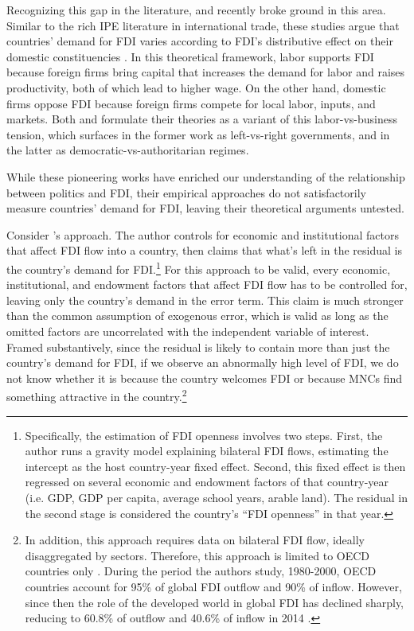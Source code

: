 Recognizing this gap in the literature, \citet{Pinto2013} and \citet{Pandya2016}
recently broke ground in this area. Similar to the rich IPE literature in
international trade, these studies argue that countries' demand for FDI varies
according to FDI's distributive effect on their domestic constituencies
\citep{Broz2001, Milner2005a}. In this theoretical framework, labor supports FDI
because foreign firms bring capital that increases the demand for labor and
raises productivity, both of which lead to higher wage. On the other hand,
domestic firms oppose FDI because foreign firms compete for local labor, inputs,
and markets. Both \citet{Pinto2013} and \citet{Pandya2016} formulate their
theories as a variant of this labor-vs-business tension, which surfaces in the
former work as left-vs-right governments, and in the latter as
democratic-vs-authoritarian regimes.

While these pioneering works have enriched our understanding of the relationship
between politics and FDI, their empirical approaches do not satisfactorily
measure countries' demand for FDI, leaving their theoretical arguments untested.

Consider \citet{Pinto2013}'s approach. The author controls for economic and
institutional factors that affect FDI flow into a country, then claims that
what's left in the residual is the country's demand for
FDI.\footnote{Specifically, the estimation of FDI openness involves two steps.
  First, the author runs a gravity model explaining bilateral FDI flows,
  estimating the intercept as the host country-year fixed effect. Second, this
  fixed effect is then regressed on several economic and endowment factors of
  that country-year (i.e. GDP, GDP per capita, average school years, arable
  land). The residual in the second stage is considered the country's ``FDI
  openness'' in that year.} For this approach to be valid, every economic,
institutional, and endowment factors that affect FDI flow has to be controlled
for, leaving only the country's demand in the error term. This claim is much
stronger than the common assumption of exogenous error, which is valid as long
as the omitted factors are uncorrelated with the independent variable of
interest. Framed substantively, since the residual is likely to contain more
than just the country's demand for FDI, if we observe an abnormally high level
of FDI, we do not know whether it is because the country welcomes FDI or because
MNCs find something attractive in the country.\footnote{In addition, this
  approach requires data on bilateral FDI flow, ideally disaggregated by
  sectors. Therefore, this approach is limited to OECD countries only
  \citep{Pinto2008}. During the period the authors study, 1980-2000, OECD
  countries account for 95\% of global FDI outflow and 90\% of inflow. However,
  since then the role of the developed world in global FDI has declined sharply,
  reducing to 60.8\% of outflow and 40.6\% of inflow in 2014
  \citep{UNCTAD2015}.}

